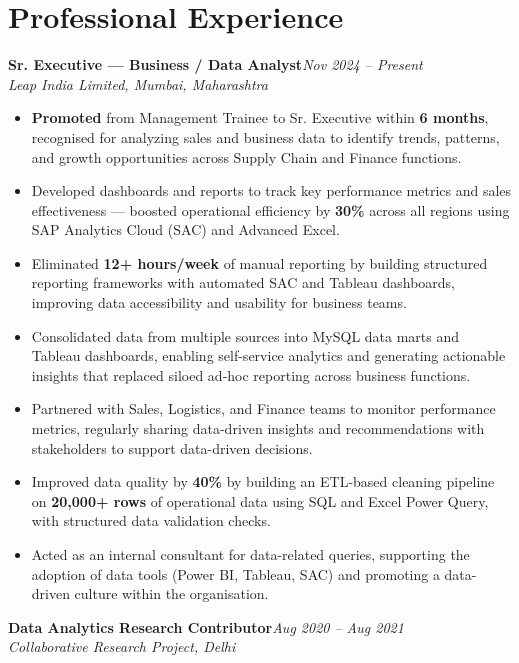 \documentclass[10pt, letterpaper]{article}
\newcommand{\role}[3]{%
  \vspace{2pt}%
  {\bfseries #1}\hfill{\small\color{muted}\textit{#3}}\\[-2pt]%
  {\small\color{muted}\textit{#2}}%
}
\begin{document}
\section{Professional Experience}

\role{Sr. Executive — Business / Data Analyst}{Leap India Limited, Mumbai, Maharashtra}{Nov 2024 – Present}

\begin{itemize}
  \item \textbf{Promoted} from Management Trainee to Sr. Executive within \textbf{6 months}, recognised for analyzing sales and business data to identify trends, patterns, and growth opportunities across Supply Chain and Finance functions.
  \item Developed dashboards and reports to track key performance metrics and sales effectiveness — boosted operational efficiency by \textbf{30\%} across all regions using SAP Analytics Cloud (SAC) and Advanced Excel.
  \item Eliminated \textbf{12+ hours/week} of manual reporting by building structured reporting frameworks with automated SAC and Tableau dashboards, improving data accessibility and usability for business teams.
  \item Consolidated data from multiple sources into MySQL data marts and Tableau dashboards, enabling self-service analytics and generating actionable insights that replaced siloed ad-hoc reporting across business functions.
  \item Partnered with Sales, Logistics, and Finance teams to monitor performance metrics, regularly sharing data-driven insights and recommendations with stakeholders to support data-driven decisions.
  \item Improved data quality by \textbf{40\%} by building an ETL-based cleaning pipeline on \textbf{20,000+ rows} of operational data using SQL and Excel Power Query, with structured data validation checks.
  \item Acted as an internal consultant for data-related queries, supporting the adoption of data tools (Power BI, Tableau, SAC) and promoting a data-driven culture within the organisation.
\end{itemize}

\vspace{1pt}

\role{Data Analytics Research Contributor}{Collaborative Research Project, Delhi}{Aug 2020 – Aug 2021}
\end{document}
